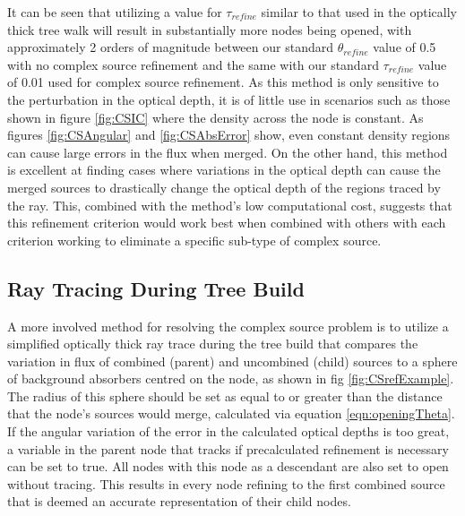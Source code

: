 It can be seen that utilizing a value for $\tau_{refine}$ similar to that used in the optically thick tree walk will result in substantially more nodes being opened, with approximately 2 orders of magnitude between our standard $\theta_{refine}$ value of 0.5 with no complex source refinement and the same with our standard $\tau_{refine}$ value of 0.01 used for complex source refinement.
\fi
As this method is only sensitive to the perturbation in the optical depth, it is of little use in scenarios such as those shown in figure \ref{fig:CSIC} where the density across the node is constant. As figures \ref{fig:CSAngular} and \ref{fig:CSAbsError} show, even constant density regions can cause large errors in the flux when merged. On the other hand, this method is excellent at finding cases where variations in the optical depth can cause the merged sources to drastically change the optical depth of the regions traced by the ray. This, combined with the method's low computational cost, suggests that this refinement criterion would work best when combined with others with each criterion working to eliminate a specific sub-type of complex source.

\subsection{Ray Tracing During Tree Build}

A more involved method for resolving the complex source problem is to utilize a simplified optically thick ray trace during the tree build that compares the variation in flux of combined (parent) and uncombined (child) sources to a sphere of background absorbers centred on the node, as shown in fig \ref{fig:CSrefExample}. The radius of this sphere should be set as equal to or greater than the distance that the node's sources would merge, calculated via equation \ref{eqn:openingTheta}. If the angular variation of the error in the calculated optical depths is too great, a variable in the parent node that tracks if precalculated refinement is necessary can be set to true. All nodes with this node as a descendant are also set to open without tracing. This results in every node refining to the first combined source that is deemed an accurate representation of their child nodes.

